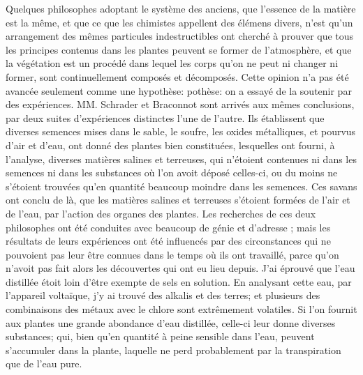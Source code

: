 Quelques philosophes adoptant le système des anciens, que l'essence de la matière est la même, et que ce que les chimistes appellent des élémens divers, n'est qu'un arrangement des mêmes particules indestructibles ont cherché à prouver que tous les principes contenus dans les plantes peuvent se former de l'atmosphère, et que la végétation est un procédé dans lequel les corps qu'on ne peut ni changer ni former, sont continuellement composés et décomposés. Cette opinion n'a pas été avancée seulement comme une hypothèse:\setcounter{page}{211} pothèse: on a essayé de la soutenir par des expériences. MM. Schrader et Braconnot sont arrivés aux mêmes conclusions, par deux suites d'expériences distinctes l'une de l'autre. Ils établissent que diverses semences mises dans le sable, le soufre, les oxides métalliques, et pourvus d'air et d'eau, ont donné des plantes bien constituées, lesquelles ont fourni, à l'analyse, diverses matières salines et terreuses, qui n'étoient contenues ni dans les semences ni dans les substances où l'on avoit déposé celles-ci, ou du moins ne s'étoient trouvées qu'en quantité beaucoup moindre dans les semences. Ces savans ont conclu de là, que les matières salines et terreuses s'étoient formées de l'air et de l'eau, par l'action des organes des plantes. Les recherches de ces deux philosophes ont été conduites avec beaucoup de génie et d'adresse ; mais les résultats de leurs expériences ont été influencés par des circonstances qui ne pouvoient pas leur être connues dans le temps où ils ont travaillé, parce qu'on n'avoit pas fait alors les découvertes qui ont eu lieu depuis. J'ai éprouvé que l'eau distillée étoit loin d'être exempte de sels en solution. En analysant cette eau, par l'appareil voltaïque,\setcounter{page}{212} j'y ai trouvé des alkalis et des terres; et plusieurs des combinaisons des métaux avec le chlore sont extrêmement volatiles. Si l'on fournit aux plantes une grande abondance d'eau distillée, celle-ci leur donne diverses substances; qui, bien qu'en quantité à peine sensible dans l'eau, peuvent s'accumuler dans la plante, laquelle ne perd probablement par la transpiration que de l'eau pure.
